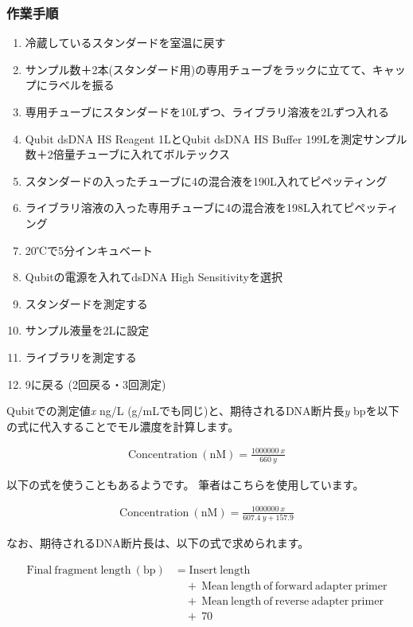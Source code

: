 \documentclass[titlepage,10pt,a4paper,uplatex]{jsbook}
\begin{document}
\subsubsection{作業手順}
\begin{enumerate}
\item 冷蔵しているスタンダードを室温に戻す
\item サンプル数＋2本(スタンダード用)の専用チューブをラックに立てて、キャップにラベルを振る
\item 専用チューブにスタンダードを10{\textmu}Lずつ、ライブラリ溶液を2{\textmu}Lずつ入れる
\item Qubit dsDNA HS Reagent 1{\textmu}LとQubit dsDNA HS Buffer 199{\textmu}Lを測定サンプル数＋2倍量チューブに入れてボルテックス
\item スタンダードの入ったチューブに4の混合液を190{\textmu}L入れてピペッティング
\item ライブラリ溶液の入った専用チューブに4の混合液を198{\textmu}L入れてピペッティング
\item 20℃で5分インキュベート
\item Qubitの電源を入れてdsDNA High Sensitivityを選択
\item スタンダードを測定する
\item サンプル液量を2{\textmu}Lに設定
\item ライブラリを測定する
\item 9に戻る (2回戻る・3回測定)
\end{enumerate}

Qubitでの測定値\textit{x} ng/{\textmu}L ({\textmu}g/mLでも同じ)と、期待されるDNA断片長\textit{y} bpを以下の式に代入することでモル濃度を計算します。

\begin{align*}
\mathrm{Concentration~(nM)} = \frac{1000000\ x}{660\ y}
\end{align*}

以下の式を使うこともあるようです。
筆者はこちらを使用しています。

\begin{align*}
\mathrm{Concentration~(nM)} = \frac{1000000\ x}{607.4\ y + 157.9}
\end{align*}

なお、期待されるDNA断片長は、以下の式で求められます。

\begin{align*}
\mathrm{Final~fragment~length~(bp)} &= \mathrm{Insert~length} \\
            &\quad + \ \mathrm{Mean~length~of~forward~adapter~primer} \\
            &\quad + \ \mathrm{Mean~length~of~reverse~adapter~primer} \\
            &\quad + \ 70
\end{align*}
\end{document}
